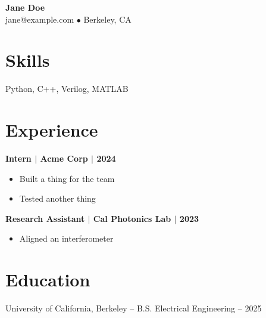 \documentclass[11pt,letterpaper]{article}
\begin{document}
\begin{center}
{\LARGE \textbf{Jane Doe}}\\
\small jane@example.com $\bullet$ Berkeley, CA
\end{center}

\section*{Skills}
Python, C++, Verilog, MATLAB

\section*{Experience}
\noindent\textbf{Intern $\vert$ Acme Corp $\vert$ 2024}
\begin{itemize}
\item Built a thing for the team
\item Tested another thing
\end{itemize}

\noindent\textbf{Research Assistant $\vert$ Cal Photonics Lab $\vert$ 2023}
\begin{itemize}
\item Aligned an interferometer
\end{itemize}

\section*{Education}
University of California, Berkeley -- B.S. Electrical Engineering -- 2025
\end{document}
